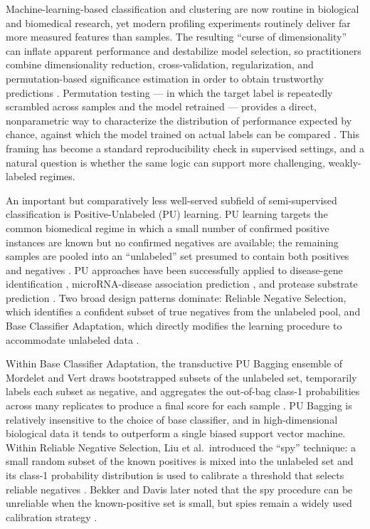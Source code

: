 \documentclass[11pt]{article}
\begin{document}
Machine-learning-based classification and clustering are now routine in biological and biomedical research, yet modern profiling experiments routinely deliver far more measured features than samples. The resulting ``curse of dimensionality'' can inflate apparent performance and destabilize model selection, so practitioners combine dimensionality reduction, cross-validation, regularization, and permutation-based significance estimation in order to obtain trustworthy predictions \cite{harris2020numpy,virtanen2020scipy,pedregosa2011scikit}. Permutation testing --- in which the target label is repeatedly scrambled across samples and the model retrained --- provides a direct, nonparametric way to characterize the distribution of performance expected by chance, against which the model trained on actual labels can be compared \cite{ojala2010permutation,breiman1996bagging}. This framing has become a standard reproducibility check in supervised settings, and a natural question is whether the same logic can support more challenging, weakly-labeled regimes.

An important but comparatively less well-served subfield of semi-supervised classification is Positive-Unlabeled (PU) learning. PU learning targets the common biomedical regime in which a small number of confirmed positive instances are known but no confirmed negatives are available; the remaining samples are pooled into an ``unlabeled'' set presumed to contain both positives and negatives \cite{bekker2020pulearning,elkan2008learning,li2022pulearning}. PU approaches have been successfully applied to disease-gene identification \cite{yang2014epu}, microRNA-disease association prediction \cite{wang2019nsemda}, and protease substrate prediction \cite{li2019protease}. Two broad design patterns dominate: Reliable Negative Selection, which identifies a confident subset of true negatives from the unlabeled pool, and Base Classifier Adaptation, which directly modifies the learning procedure to accommodate unlabeled data \cite{li2022pulearning}.

Within Base Classifier Adaptation, the transductive PU Bagging ensemble of Mordelet and Vert draws bootstrapped subsets of the unlabeled set, temporarily labels each subset as negative, and aggregates the out-of-bag class-1 probabilities across many replicates to produce a final score for each sample \cite{mordelet2014bagging,breiman1996bagging}. PU Bagging is relatively insensitive to the choice of base classifier, and in high-dimensional biological data it tends to outperform a single biased support vector machine. Within Reliable Negative Selection, Liu et al.\ introduced the ``spy'' technique: a small random subset of the known positives is mixed into the unlabeled set and its class-1 probability distribution is used to calibrate a threshold that selects reliable negatives \cite{liu2003spy}. Bekker and Davis later noted that the spy procedure can be unreliable when the known-positive set is small, but spies remain a widely used calibration strategy \cite{bekker2020pulearning}.
\end{document}
